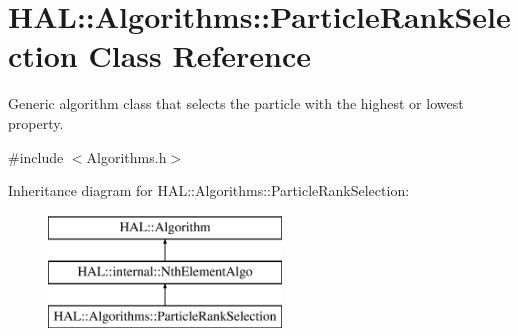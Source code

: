\hypertarget{class_h_a_l_1_1_algorithms_1_1_particle_rank_selection}{\section{H\+A\+L\+:\+:Algorithms\+:\+:Particle\+Rank\+Selection Class Reference}
\label{class_h_a_l_1_1_algorithms_1_1_particle_rank_selection}
}


Generic algorithm class that selects the particle with the highest or lowest property.  




{\ttfamily \#include $<$Algorithms.\+h$>$}

Inheritance diagram for H\+A\+L\+:\+:Algorithms\+:\+:Particle\+Rank\+Selection\+:\begin{figure}[H]
\begin{center}
\leavevmode
\includegraphics[height=3.000000cm]{class_h_a_l_1_1_algorithms_1_1_particle_rank_selection}
\end{center}
\end{figure}
